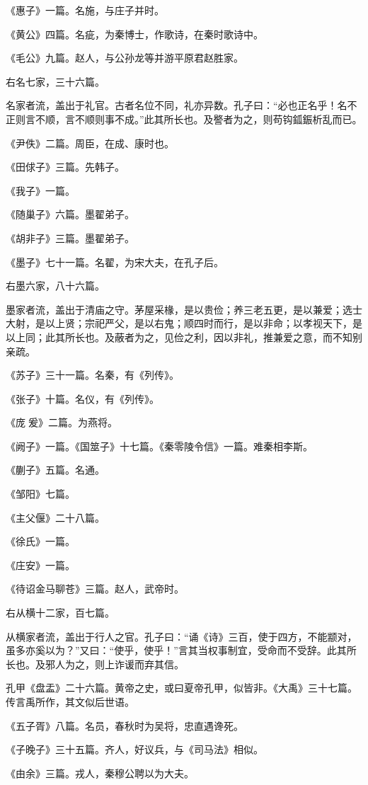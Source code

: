 \documentclass[]{article}
\begin{document}
《惠子》一篇。名施，与庄子并时。

《黄公》四篇。名疵，为秦博士，作歌诗，在秦时歌诗中。

《毛公》九篇。赵人，与公孙龙等并游平原君赵胜家。

右名七家，三十六篇。

名家者流，盖出于礼官。古者名位不同，礼亦异数。孔子曰：``必也正名乎！名不正则言不顺，言不顺则事不成。''此其所长也。及譥者为之，则苟钩鈲鋠析乱而已。

《尹佚》二篇。周臣，在成、康时也。

《田俅子》三篇。先韩子。

《我子》一篇。

《随巢子》六篇。墨翟弟子。

《胡非子》三篇。墨翟弟子。

《墨子》七十一篇。名翟，为宋大夫，在孔子后。

右墨六家，八十六篇。

墨家者流，盖出于清庙之守。茅屋采椽，是以贵俭；养三老五更，是以兼爱；选士大射，是以上贤；宗祀严父，是以右鬼；顺四时而行，是以非命；以孝视天下，是以上同；此其所长也。及蔽者为之，见俭之利，因以非礼，推兼爱之意，而不知别亲疏。

《苏子》三十一篇。名秦，有《列传》。

《张子》十篇。名仪，有《列传》。

《庞爰》二篇。为燕将。

《阙子》一篇。《国筮子》十七篇。《秦零陵令信》一篇。难秦相李斯。

《蒯子》五篇。名通。

《邹阳》七篇。

《主父偃》二十八篇。

《徐氏》一篇。

《庄安》一篇。

《待诏金马聊苍》三篇。赵人，武帝时。

右从横十二家，百七篇。

从横家者流，盖出于行人之官。孔子曰：``诵《诗》三百，使于四方，不能颛对，虽多亦奚以为？''又曰：``使乎，使乎！''言其当权事制宜，受命而不受辞。此其所长也。及邪人为之，则上诈谖而弃其信。

孔甲《盘盂》二十六篇。黄帝之史，或曰夏帝孔甲，似皆非。《大禹》三十七篇。传言禹所作，其文似后世语。

《五子胥》八篇。名员，春秋时为吴将，忠直遇谗死。

《子晚子》三十五篇。齐人，好议兵，与《司马法》相似。

《由余》三篇。戎人，秦穆公聘以为大夫。
\end{document}
